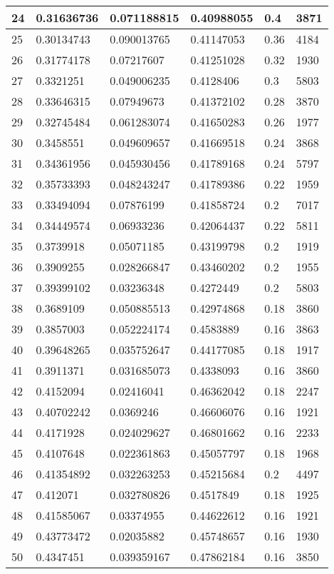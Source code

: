 \begin{longtable}{|l|l|l|l|l|l|}
24 & 0.31636736 & 0.071188815 & 0.40988055 & 0.4 & 3871 \\ \hline 
25 & 0.30134743 & 0.090013765 & 0.41147053 & 0.36 & 4184 \\ \hline 
26 & 0.31774178 & 0.07217607 & 0.41251028 & 0.32 & 1930 \\ \hline 
27 & 0.3321251 & 0.049006235 & 0.4128406 & 0.3 & 5803 \\ \hline 
28 & 0.33646315 & 0.07949673 & 0.41372102 & 0.28 & 3870 \\ \hline 
29 & 0.32745484 & 0.061283074 & 0.41650283 & 0.26 & 1977 \\ \hline 
30 & 0.3458551 & 0.049609657 & 0.41669518 & 0.24 & 3868 \\ \hline 
31 & 0.34361956 & 0.045930456 & 0.41789168 & 0.24 & 5797 \\ \hline 
32 & 0.35733393 & 0.048243247 & 0.41789386 & 0.22 & 1959 \\ \hline 
33 & 0.33494094 & 0.07876199 & 0.41858724 & 0.2 & 7017 \\ \hline 
34 & 0.34449574 & 0.06933236 & 0.42064437 & 0.22 & 5811 \\ \hline 
35 & 0.3739918 & 0.05071185 & 0.43199798 & 0.2 & 1919 \\ \hline 
36 & 0.3909255 & 0.028266847 & 0.43460202 & 0.2 & 1955 \\ \hline 
37 & 0.39399102 & 0.03236348 & 0.4272449 & 0.2 & 5803 \\ \hline 
38 & 0.3689109 & 0.050885513 & 0.42974868 & 0.18 & 3860 \\ \hline 
39 & 0.3857003 & 0.052224174 & 0.4583889 & 0.16 & 3863 \\ \hline 
40 & 0.39648265 & 0.035752647 & 0.44177085 & 0.18 & 1917 \\ \hline 
41 & 0.3911371 & 0.031685073 & 0.4338093 & 0.16 & 3860 \\ \hline 
42 & 0.4152094 & 0.02416041 & 0.46362042 & 0.18 & 2247 \\ \hline 
43 & 0.40702242 & 0.0369246 & 0.46606076 & 0.16 & 1921 \\ \hline 
44 & 0.4171928 & 0.024029627 & 0.46801662 & 0.16 & 2233 \\ \hline 
45 & 0.4107648 & 0.022361863 & 0.45057797 & 0.18 & 1968 \\ \hline 
46 & 0.41354892 & 0.032263253 & 0.45215684 & 0.2 & 4497 \\ \hline 
47 & 0.412071 & 0.032780826 & 0.4517849 & 0.18 & 1925 \\ \hline 
48 & 0.41585067 & 0.03374955 & 0.44622612 & 0.16 & 1921 \\ \hline 
49 & 0.43773472 & 0.02035882 & 0.45748657 & 0.16 & 1930 \\ \hline 
50 & 0.4347451 & 0.039359167 & 0.47862184 & 0.16 & 3850 \\ \hline 
\end{longtable}